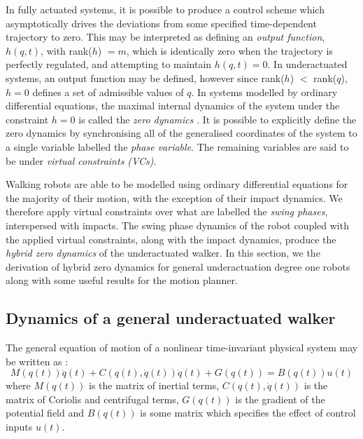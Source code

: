 In fully actuated systems, it is possible to produce a control scheme which asymptotically drives the deviations from some specified time-dependent trajectory to zero. This may be interpreted as defining an \textit{output function}, $h(q,t)$, with rank($h$) $= m$, which is identically zero when the trajectory is perfectly regulated, and attempting to maintain $h(q,t) = 0$. In underactuated systems, an output function may be defined, however since rank($h$) $<$ rank($q$), $h = 0$ defines a set of admissible values of $q$. In systems modelled by ordinary differential equations, the maximal internal dynamics of the system under the constraint $h=0$ is called the \textit{zero dynamics} \cite{isidori1995nonlinear}. It is possible to explicitly define the zero dynamics by synchronising all of the generalised coordinates of the system to a single variable labelled the \textit{phase variable}. The remaining variables are said to be under \textit{virtual constraints (VCs)}. %

Walking robots are able to be modelled using ordinary differential equations for the majority of their motion, with the exception of their impact dynamics. We therefore apply virtual constraints over what are labelled the \textit{swing phases}, interspersed with impacts. The swing phase dynamics of the robot coupled with the applied virtual constraints, along with the impact dynamics, produce the \textit{hybrid zero dynamics} of the underactuated walker. In this section, we the derivation of hybrid zero dynamics for general underactuation degree one robots along with some useful results for the motion planner.

\subsection{Dynamics of a general underactuated walker}
The general equation of motion of a nonlinear time-invariant physical system may be written as \cite{??}:
\begin{equation}\label{eqn:dynamics}
	M\left(q(t)\right)\ddot{q}(t) + C\left(q(t),\dot{q}(t)\right)\dot{q}(t)
	 + G\left(q(t)\right) = B\left(q(t)\right)u(t)
\end{equation}
where $M\left(q(t)\right)$ is the matrix of inertial terms, $C\left(q(t),\dot{q}(t)\right)$ is the matrix of Coriolis and centrifugal terms, $G\left(q(t)\right)$ is the gradient of the potential field and $B\left(q(t)\right)$ is some matrix which specifies the effect of control inputs $u(t)$. 

